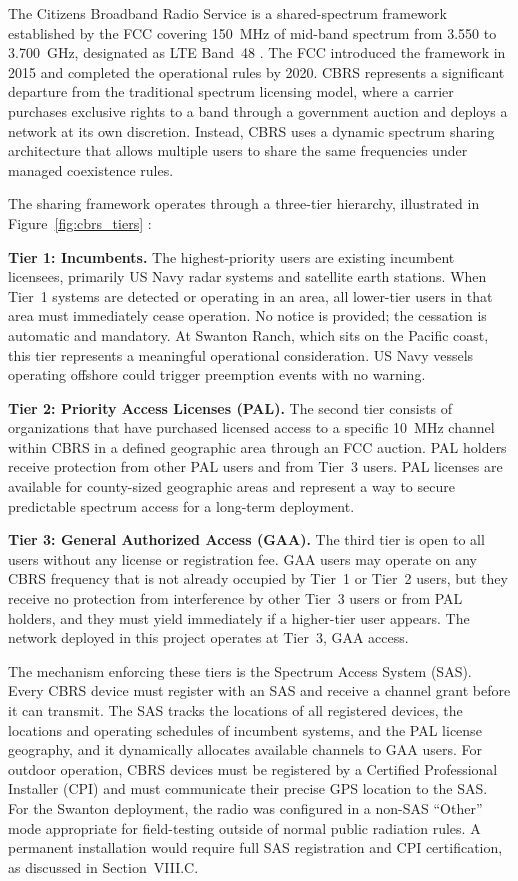 \documentclass[
    left=1.5in,
    right=1.25in,
    top=1.25in,
    bottom=1.25in
]{CalPolySeniorProject}
\begin{document}
The Citizens Broadband Radio Service is a shared-spectrum framework established
by the FCC covering 150~MHz of mid-band spectrum from 3.550 to 3.700~GHz,
designated as LTE Band~48 \autocite{fcc2015cbrs}. The FCC introduced the
framework in 2015 and completed the operational rules by 2020. CBRS represents
a significant departure from the traditional spectrum licensing model, where a
carrier purchases exclusive rights to a band through a government auction and
deploys a network at its own discretion. Instead, CBRS uses a dynamic spectrum
sharing architecture that allows multiple users to share the same frequencies
under managed coexistence rules.

The sharing framework operates through a three-tier hierarchy, illustrated in
Figure~\ref{fig:cbrs_tiers} \autocite{fcc2015cbrs}:

\textbf{Tier 1: Incumbents.} The highest-priority users are existing incumbent
licensees, primarily US Navy radar systems and satellite earth stations. When
Tier~1 systems are detected or operating in an area, all lower-tier users in
that area must immediately cease operation. No notice is provided; the cessation
is automatic and mandatory. At Swanton Ranch, which sits on the Pacific coast,
this tier represents a meaningful operational consideration. US Navy vessels
operating offshore could trigger preemption events with no warning.

\textbf{Tier 2: Priority Access Licenses (PAL).} The second tier consists of
organizations that have purchased licensed access to a specific 10~MHz channel
within CBRS in a defined geographic area through an FCC auction. PAL holders
receive protection from other PAL users and from Tier~3 users. PAL licenses are
available for county-sized geographic areas and represent a way to secure
predictable spectrum access for a long-term deployment.

\textbf{Tier 3: General Authorized Access (GAA).} The third tier is open to all
users without any license or registration fee. GAA users may operate on any
CBRS frequency that is not already occupied by Tier~1 or Tier~2 users, but they
receive no protection from interference by other Tier~3 users or from PAL
holders, and they must yield immediately if a higher-tier user appears. The
network deployed in this project operates at Tier~3, GAA access.

The mechanism enforcing these tiers is the Spectrum Access System (SAS). Every
CBRS device must register with an SAS and receive a channel grant before it can
transmit. The SAS tracks the locations of all registered devices, the locations
and operating schedules of incumbent systems, and the PAL license geography, and
it dynamically allocates available channels to GAA users. For outdoor operation,
CBRS devices must be registered by a Certified Professional Installer (CPI) and
must communicate their precise GPS location to the SAS. For the Swanton
deployment, the radio was configured in a non-SAS ``Other'' mode appropriate for
field-testing outside of normal public radiation rules. A permanent installation
would require full SAS registration and CPI certification, as discussed in
Section~VIII.C.
\end{document}
